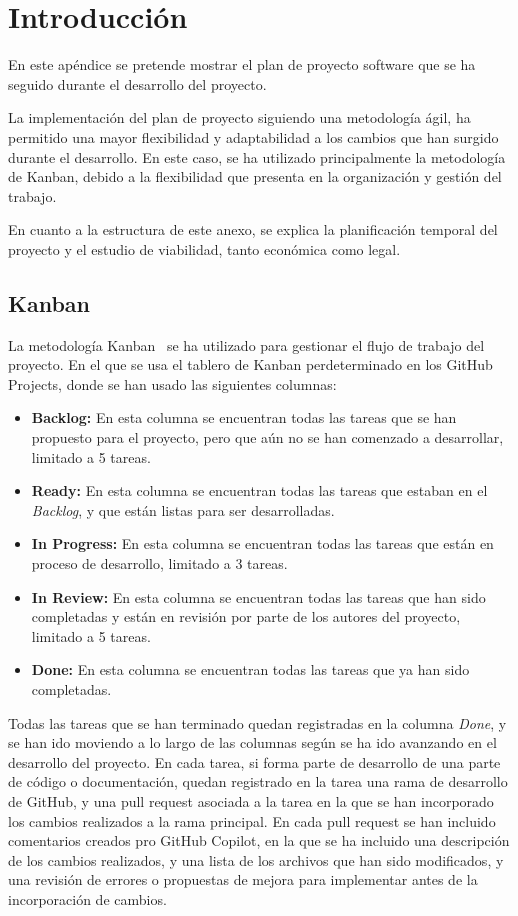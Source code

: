 
\section{Introducción}
En este apéndice se pretende mostrar el plan de proyecto software que se ha seguido durante el desarrollo del proyecto.

La implementación del plan de proyecto siguiendo una metodología ágil, ha permitido una mayor flexibilidad y adaptabilidad a los cambios que han surgido durante el desarrollo. En este caso, se ha utilizado principalmente la metodología de Kanban, debido a la flexibilidad que presenta en la organización y gestión del trabajo.

En cuanto a la estructura de este anexo, se explica la planificación temporal del proyecto y el estudio de viabilidad, tanto económica como legal. 

\subsection{Kanban}
La metodología Kanban~\cite{JuliaMartins2025} se ha utilizado para gestionar el flujo de trabajo del proyecto. En el que se usa el tablero de Kanban perdeterminado en los GitHub Projects, donde se han usado las siguientes columnas:
\begin{itemize}
    \item \textbf{Backlog:} En esta columna se encuentran todas las tareas que se han propuesto para el proyecto, pero que aún no se han comenzado a desarrollar, limitado a 5 tareas.
    \item \textbf{Ready:} En esta columna se encuentran todas las tareas que estaban en el \textit{Backlog}, y que están listas para ser desarrolladas.
    \item \textbf{In Progress:} En esta columna se encuentran todas las tareas que están en proceso de desarrollo, limitado a 3 tareas.
    \item \textbf{In Review:} En esta columna se encuentran todas las tareas que han sido completadas y están en revisión por parte de los autores del proyecto, limitado a 5 tareas.
    \item \textbf{Done:} En esta columna se encuentran todas las tareas que ya han sido completadas.
\end{itemize}

Todas las tareas que se han terminado quedan registradas en la columna \textit{Done}, y se han ido moviendo a lo largo de las columnas según se ha ido avanzando en el desarrollo del proyecto. En cada tarea, si forma parte de desarrollo de una parte de código o documentación, quedan registrado en la tarea una rama de desarrollo de GitHub, y una pull request asociada a la tarea en la que se han incorporado los cambios realizados a la rama principal. En cada pull request se han incluido comentarios creados pro GitHub Copilot, en la que se ha incluido una descripción de los cambios realizados, y una lista de los archivos que han sido modificados, y una revisión de errores o propuestas de mejora para implementar antes de la incorporación de cambios.

